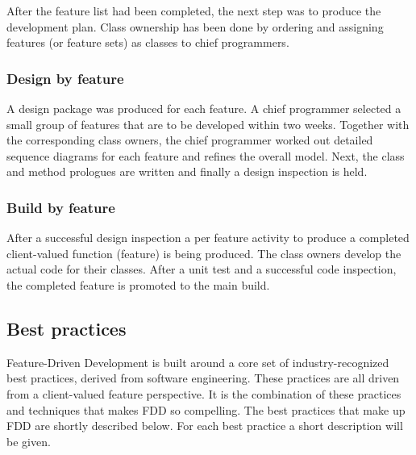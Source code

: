 After the feature list had been completed, the next step was to produce the development plan. Class ownership has been done by ordering and assigning features (or feature sets) as classes to chief programmers.

\subsubsection{Design by feature}

A design package was produced for each feature. A chief programmer selected a small group of features that are to be developed within two weeks. Together with the corresponding class owners, the chief programmer worked out detailed sequence diagrams for each feature and refines the overall model. Next, the class and method prologues are written and finally a design inspection is held.

\subsubsection{Build by feature}

After a successful design inspection a per feature activity to produce a completed client-valued function (feature) is being produced. The class owners develop the actual code for their classes. After a unit test and a successful code inspection, the completed feature is promoted to the main build.

\subsection{Best practices}

Feature-Driven Development is built around a core set of industry-recognized best practices, derived from software engineering. These practices are all driven from a client-valued feature perspective. It is the combination of these practices and techniques that makes FDD so compelling. The best practices that make up FDD are shortly described below. For each best practice a short description will be given.

